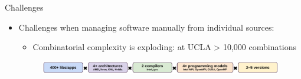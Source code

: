 \documentclass[final]{beamer}
\newlength{\onecolwid}
\begin{document}
\begin{frame}[t]
\begin{columns}[t]
\begin{column}{\onecolwid}
\begin{block}{Challenges}



\setlength{\leftmargini}{1cm}
\setlength{\leftmarginii}{2.5cm}
\setlength{\leftmarginiii}{2.5cm}
\begin{itemize}
    \item Challenges when managing software manually from individual sources: 
        \begin{itemize}
            \item Combinatorial complexity is exploding: at UCLA > 10,000 combinations
        \end{itemize}
        \begin{figure}[htbp]
          \centerline{\includegraphics[width=1\linewidth]{figures/CombComp_ucla.pdf}}
          \label{fig:combcomp_ucla}
        \end{figure}


\end{itemize}
\end{block}
\end{column}
\end{columns}
\end{frame}
\end{document}
